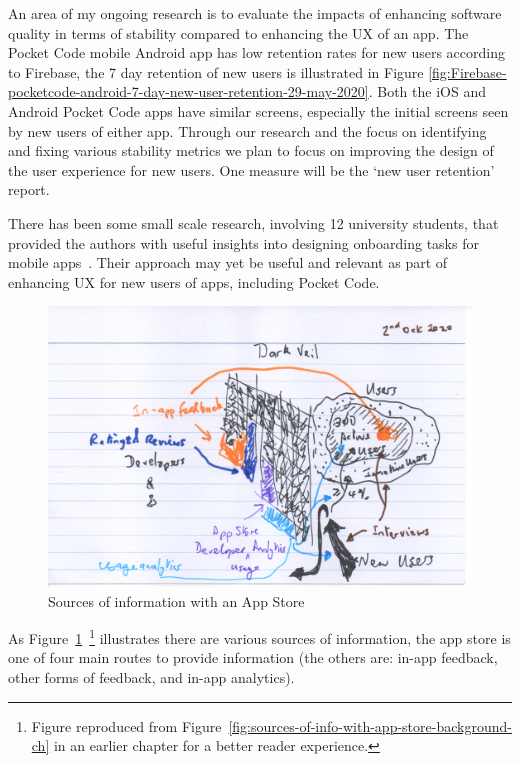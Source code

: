 An area of my ongoing research is to evaluate the impacts of enhancing software quality in terms of stability compared to enhancing the UX of an app. The Pocket Code mobile Android app has low retention rates for new users according to Firebase, the 7 day retention of new users is illustrated in Figure \ref{fig:Firebase-pocketcode-android-7-day-new-user-retention-29-may-2020}. Both the iOS and Android Pocket Code apps have similar screens, especially the initial screens seen by new users of either app. Through our research and the focus on identifying and fixing various stability metrics we plan to focus on improving the design of the user experience for new users. One measure will be the `new user retention' report.

There has been some small scale research, involving 12 university students, that provided the authors with useful insights into designing onboarding tasks for mobile apps~\citep{strahm2018_mobile_app_onboarding}. Their approach may yet be useful and relevant as part of enhancing UX for new users of apps, including Pocket Code.

\begin{figure}[ht]
    \centering
    \includegraphics[width=13cm]{images/rough-sketches/sources-of-information-with-app-store-1.png}
    \caption{Sources of information with an App Store}
    \label{fig:sources-of-info-with-app-store-future-work-ch}
\end{figure}

As Figure~\ref{fig:sources-of-info-with-app-store-future-work-ch}~\footnote{Figure reproduced from Figure~\ref{fig:sources-of-info-with-app-store-background-ch} in an earlier chapter for a better reader experience.} illustrates there are various sources of information, the app store is one of four main routes to provide information (the others are: in-app feedback, other forms of feedback, and in-app analytics).

